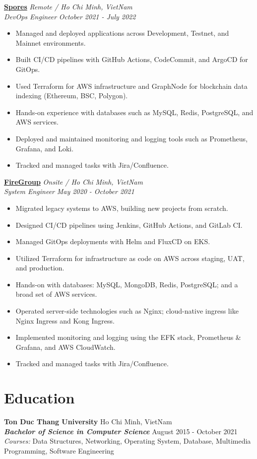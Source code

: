 \documentclass[11pt, a4paper]{article}
\begin{document}
\vspace{0.5em}
\textbf{\href{https://spores.app/}{Spores}} \hfill {\small\textit{Remote / Ho Chi Minh, VietNam}} \\
\textit{DevOps Engineer} \hfill {\small\textit{October 2021 - July 2022}}
\begin{itemize}[leftmargin=*]
    \item Managed and deployed applications across Development, Testnet, and Mainnet environments.
    \item Built CI/CD pipelines with GitHub Actions, CodeCommit, and ArgoCD for GitOps.
    \item Used Terraform for AWS infrastructure and Graph\-Node for block\-chain data in\-dex\-ing (Ethereum, BSC, Polygon).
    \item Hands-on experience with databases such as MySQL, Redis, PostgreSQL, and AWS services.
    \item Deployed and maintained monitoring and logging tools such as Prometheus, Grafana, and Loki.
    \item Tracked and managed tasks with Jira/Confluence.
\end{itemize}

\vspace{0.5em}
\textbf{\href{https://firegroup.io/}{FireGroup}} \hfill {\small\textit{Onsite / Ho Chi Minh, VietNam}} \\
\textit{System Engineer} \hfill {\small\textit{May 2020 - October 2021}}
\begin{itemize}[leftmargin=*]
    \item Migrated legacy systems to AWS, building new projects from scratch.
    \item Designed CI/CD pipelines using Jenkins, GitHub Actions, and GitLab CI.
    \item Managed GitOps deployments with Helm and FluxCD on EKS.
    \item Utilized Terraform for infrastructure as code on AWS across staging, UAT, and production.
    \item Hands-on with databases: MySQL, MongoDB, Redis, PostgreSQL; and a broad set of AWS services.
    \item Operated server-side technologies such as Nginx; cloud-native ingress like Nginx Ingress and Kong Ingress.
    \item Implemented monitoring and logging using the EFK stack, Prometheus \& Grafana, and AWS CloudWatch.
    \item Tracked and managed tasks with Jira/Confluence.
\end{itemize}


\section{Education}
\textbf{Ton Duc Thang University} \hfill Ho Chi Minh, VietNam \\
\textit{\textbf{Bachelor of Science in Computer Science}} \hfill August 2015 - October 2021 \\
\textit{Courses:} Data Structures, Networking, Operating System, Database, Multimedia Programming, Software Engineering
\end{document}
